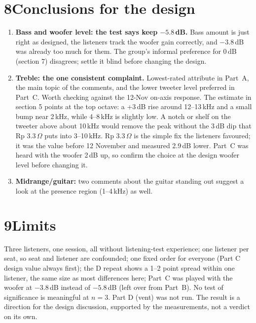 \documentclass[11pt,a4paper]{article}
\begin{document}
\section*{8\quad Conclusions for the design}
\begin{enumerate}\setlength{\itemsep}{2pt}
\item \textbf{Bass and woofer level: the test says keep $-5.8$\,dB.} Bass amount is just right as designed,
the listeners track the woofer gain correctly, and $-3.8$\,dB was already too much for them. The group's
informal preference for 0\,dB (section 7) disagrees; settle it blind before changing the design.
\item \textbf{Treble: the one consistent complaint.} Lowest-rated attribute in Part~A, the main topic of the
comments, and the lower tweeter level preferred in Part~C. Worth checking against the 12-Nov on-axis
response. The estimate in section 5 points at the top octave: a +3\,dB rise around 12--13\,kHz and a
small bump near 2\,kHz, while 4--8\,kHz is slightly low. A notch or shelf on the tweeter above about
10\,kHz would remove the peak without the 3\,dB dip that Rp 3.3\,$\Omega$ puts into 3--10\,kHz.
Rp 3.3\,$\Omega$ is the simple fix the listeners favoured; it was
the value before 12 November and measured 2.9\,dB lower. Part~C was heard with the woofer 2\,dB up,
so confirm the choice at the design woofer level before changing it.
\item \textbf{Midrange/guitar:} two comments about the guitar standing out suggest a look at the presence
region (1--4\,kHz) as well.
\end{enumerate}

\section*{9\quad Limits}
Three listeners, one session, all without listening-test experience; one listener per seat, so seat and
listener are confounded; one fixed order for everyone (Part C design value always first); the D repeat shows
a 1--2 point spread within one listener, the same size as most differences here; Part~C was played with the woofer at $-3.8$\,dB instead of
$-5.8$\,dB (left over from Part~B). No test of significance is
meaningful at $n=3$. Part D (vent) was not run. The result is a direction for the design discussion,
supported by the measurements, not a verdict on its own.
\end{document}
